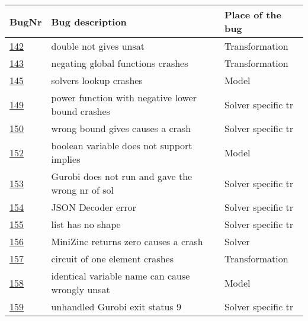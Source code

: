 \begin{table}[]
	\centering
	\begin{tabular}{lll}
		BugNr & Bug description                                         & Place of the bug \\ \toprule
		\href{https://github.com/CPMpy/cpmpy/issues/142}{142}   & double not gives unsat                                  & Transformation   \\
		\href{https://github.com/CPMpy/cpmpy/issues/143}{143}   & negating global functions crashes                       & Transformation   \\
		\href{https://github.com/CPMpy/cpmpy/issues/145}{145}   & solvers lookup crashes                                  & Model            \\
		\href{https://github.com/CPMpy/cpmpy/issues/149}{149}   & power function with negative lower bound crashes        & Solver specific tr           \\
		\href{https://github.com/CPMpy/cpmpy/issues/150}{150}   & wrong bound gives causes a crash                        & Solver specific tr         \\
		\href{https://github.com/CPMpy/cpmpy/issues/152}{152}   & boolean variable does not support implies               & Model            \\
		\href{https://github.com/CPMpy/cpmpy/issues/153}{153}   & Gurobi does not run and gave the wrong nr of sol       & Solver specific tr           \\
		\href{https://github.com/CPMpy/cpmpy/issues/154}{154}   & JSON Decoder error                                      & Solver specific tr           \\
		\href{https://github.com/CPMpy/cpmpy/issues/155}{155}   & list has no shape                                       & Solver specific tr           \\
		\href{https://github.com/CPMpy/cpmpy/issues/156}{156}   & MiniZinc returns zero causes a crash                    & Solver            \\
		\href{https://github.com/CPMpy/cpmpy/issues/157}{157}   & circuit of one element crashes                          & Transformation   \\
		\href{https://github.com/CPMpy/cpmpy/issues/158}{158}   & identical variable name can cause wrongly unsat         & Model            \\
		\href{https://github.com/CPMpy/cpmpy/issues/159}{159}   & unhandled Gurobi exit status 9                          & Solver specific tr           \\

\end{tabular}
\end{table}
